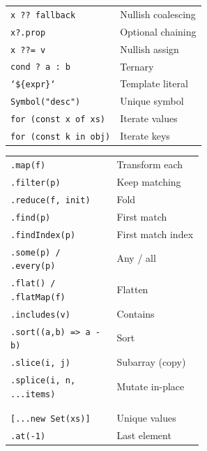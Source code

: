 \documentclass[10pt]{extarticle}
\begin{document}
\begin{multicols}{2}
\begin{tabularx}{\linewidth}{@{}l@{\enspace}Y@{}}
\texttt{x ?? fallback}             & Nullish coalescing \\
\texttt{x?.prop}                   & Optional chaining \\
\texttt{x ??= v}                   & Nullish assign \\
\texttt{cond ? a : b}              & Ternary \\
\texttt{`\$\{expr\}`}             & Template literal \\
\texttt{Symbol("desc")}            & Unique symbol \\
\texttt{for (const x of xs)}       & Iterate values \\
\texttt{for (const k in obj)}      & Iterate keys \\
\end{tabularx}

\begin{tabularx}{\linewidth}{@{}>{\raggedright\arraybackslash}p{0.55\linewidth}@{\enspace}Y@{}}
\texttt{.map(f)}                    & Transform each \\
\texttt{.filter(p)}                 & Keep matching \\
\texttt{.reduce(f, init)}          & Fold \\
\texttt{.find(p)}                   & First match \\
\texttt{.findIndex(p)}             & First match index \\
\texttt{.some(p) / .every(p)}      & Any / all \\
\texttt{.flat() / .flatMap(f)}     & Flatten \\
\texttt{.includes(v)}              & Contains \\
\texttt{.sort((a,b) => a - b)}    & Sort \\
\texttt{.slice(i, j)}              & Subarray (copy) \\
\texttt{.splice(i, n, ...items)}   & Mutate in-place \\
 & \\
 \\
\texttt{[...new Set(xs)]}          & Unique values \\
\texttt{.at(-1)}                    & Last element \\
\end{tabularx}


\end{multicols}
\end{document}
